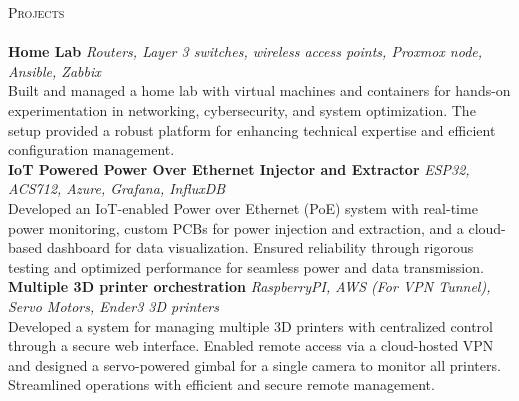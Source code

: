 \documentclass[a4paper]{article}
\newcommand{\lineunder} {
    \vspace*{-8pt} \\
    \hspace*{-18pt} \hrulefill \\
}
\newcommand{\header} [1] {
    {\hspace*{-18pt}\vspace*{6pt} \textsc{#1}}
    \vspace*{-6pt} \lineunder
}
\begin{document}
\header{Projects}
{\textbf{Home Lab}} {\sl Routers, Layer 3 switches, wireless access points, Proxmox node, Ansible, Zabbix} \\
Built and managed a home lab with virtual machines and containers for hands-on experimentation in networking, cybersecurity, and system optimization. The setup provided a robust platform for enhancing technical expertise and efficient configuration management.\\
\vspace*{2mm}
{\textbf{IoT Powered Power Over Ethernet Injector and Extractor}} {\sl ESP32, ACS712, Azure, Grafana, InfluxDB} \\
Developed an IoT-enabled Power over Ethernet (PoE) system with real-time power monitoring, custom PCBs for power injection and extraction, and a cloud-based dashboard for data visualization. Ensured reliability through rigorous testing and optimized performance for seamless power and data transmission.\\
\vspace*{2mm}
{\textbf{Multiple 3D printer orchestration}} {\sl RaspberryPI, AWS (For VPN Tunnel), Servo Motors, Ender3 3D printers} \\
Developed a system for managing multiple 3D printers with centralized control through a secure web interface. Enabled remote access via a cloud-hosted VPN and designed a servo-powered gimbal for a single camera to monitor all printers. Streamlined operations with efficient and secure remote management.\\
\vspace*{2mm}



\ 
\end{document}
